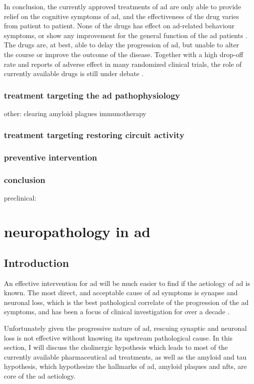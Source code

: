 In conclusion, the currently approved treatments of \gls{ad} are only able to provide relief on the cognitive symptoms of \gls{ad}, and the effectiveness of the drug varies from patient to patient. None of the drugs has effect on \gls{ad}-related behaviour symptoms, or show any improvement for the general function of the \gls{ad} patients \citep{tan14}. The drugs are, at best, able to delay the progression of \gls{ad}, but unable to alter the course or improve the outcome of the disease. Together with a high drop-off rate and reports of adverse effect in many randomized clinical trials, the role of currently available drugs is still under debate \citep{bond12}. 



\subsubsection{treatment targeting the \gls{ad} pathophysiology}
other: clearing amyloid plagues
immunotherapy
\subsubsection{treatment targeting restoring circuit activity}
\subsubsection{preventive intervention}
\subsubsection{conclusion}

preclinical: \citep{malek-ahmadi16} \citep{reiman16}

\section{neuropathology in \gls{ad}}
\subsection{Introduction}
An effective intervention for \gls{ad} will be much easier to find if the aetiology of \gls{ad} is known. The most direct, and acceptable cause of \gls{ad} symptoms is synapse and neuronal loss, which is the best pathological correlate of the progression of the \gls{ad} symptoms, and has been a focus of clinical investigation for over a decade \citep{selkoe02, coleman04}. 

Unfortunately given the progressive nature of \gls{ad}, rescuing synaptic and neuronal loss is not effective without knowing its upstream pathological cause. In this section, I will discuss the cholinergic hypothesis which leads to most of the currently available pharmaceutical \gls{ad} treatments, as well as the amyloid and tau hypothesis, which hypothesize the hallmarks of \gls{ad}, amyloid plaques and \glspl{nft}, are core of the \gls{ad} aetiology. 


